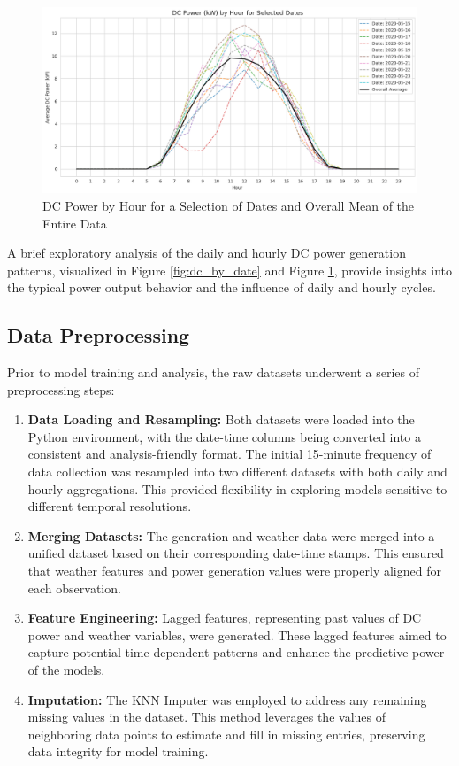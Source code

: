 \begin{figure}[!htpb]
    \centering
    \includegraphics[width=\linewidth]{Figures/dc_by_hour_f.png}
    \caption{DC Power by Hour for a Selection of Dates and Overall Mean of the Entire Data}
    \label{fig:dc_by_hour}
\end{figure}

A brief exploratory analysis of the daily and hourly DC power generation patterns, visualized in Figure \ref{fig:dc_by_date} and Figure \ref{fig:dc_by_hour}, provide insights into the typical power output behavior and the influence of daily and hourly cycles.

\subsection{Data Preprocessing}

Prior to model training and analysis, the raw datasets underwent a series of preprocessing steps:

\begin{enumerate}
   \item \textbf{Data Loading and Resampling:} Both datasets were loaded into the Python environment, with the date-time columns being converted into a consistent and analysis-friendly format. The initial 15-minute frequency of data collection was resampled into two different datasets with both daily and hourly aggregations. This provided flexibility in exploring models sensitive to different temporal resolutions.
   \item \textbf{Merging Datasets:} The generation and weather data were merged into a unified dataset based on their corresponding date-time stamps. This ensured that weather features and power generation values were properly aligned for each observation.
   \item \textbf{Feature Engineering:} Lagged features, representing past values of DC power and weather variables, were generated. These lagged features aimed to capture potential time-dependent patterns and enhance the predictive power of the models.
   \item \textbf{Imputation:} The KNN Imputer was employed to address any remaining missing values in the dataset. This method leverages the values of neighboring data points to estimate and fill in missing entries, preserving data integrity for model training.
\end{enumerate} 

